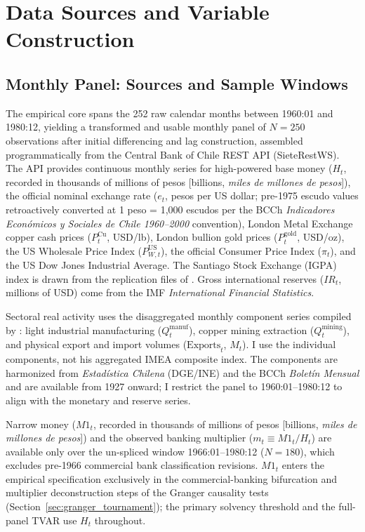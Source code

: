 \section{Data Sources and Variable Construction}
\label{sec:data_sources}

\subsection{Monthly Panel: Sources and Sample Windows}
\label{sec:monthly_panel}

The empirical core spans the 252 raw calendar months between 1960:01 and 1980:12, yielding a transformed and usable monthly panel of $N = 250$ observations after initial differencing and lag construction, assembled programmatically from the Central Bank of Chile REST API (SieteRestWS). The API provides continuous monthly series for high-powered base money ($H_t$, recorded in thousands of millions of pesos [billions, \emph{miles de millones de pesos}]), the official nominal exchange rate ($e_t$, pesos per US dollar; pre-1975 escudo values retroactively converted at 1 peso = 1{,}000 escudos per the BCCh \textit{Indicadores Económicos y Sociales de Chile 1960--2000} convention), London Metal Exchange copper cash prices ($P^{\text{Cu}}_t$, USD/lb), London bullion gold prices ($P^{\text{gold}}_t$, USD/oz), the US Wholesale Price Index ($P^{\text{US}}_{W,t}$), the official Consumer Price Index ($\pi_t$), and the US Dow Jones Industrial Average. The Santiago Stock Exchange (IGPA) index is drawn from the replication files of \citet{GirardiBowles2018}. Gross international reserves ($IR_t$, millions of USD) come from the IMF \textit{International Financial Statistics}.

Sectoral real activity uses the disaggregated monthly component series compiled by \citet{DiazBahamonde2023}: light industrial manufacturing ($Q^{\text{manuf}}_t$), copper mining extraction ($Q^{\text{mining}}_t$), and physical export and import volumes ($\text{Exports}_t$, $M_t$). I use the individual components, not his aggregated IMEA composite index. The components are harmonized from \textit{Estadística Chilena} (DGE/INE) and the BCCh \textit{Boletín Mensual} and are available from 1927 onward; I restrict the panel to 1960:01--1980:12 to align with the monetary and reserve series.

Narrow money ($M1_t$, recorded in thousands of millions of pesos [billions, \emph{miles de millones de pesos}]) and the observed banking multiplier ($m_t \equiv M1_t / H_t$) are available only over the un-spliced window 1966:01--1980:12 ($N = 180$), which excludes pre-1966 commercial bank classification revisions. $M1_t$ enters the empirical specification exclusively in the commercial-banking bifurcation and multiplier deconstruction steps of the Granger causality tests (Section~\ref{sec:granger_tournament}); the primary solvency threshold and the full-panel TVAR use $H_t$ throughout.

